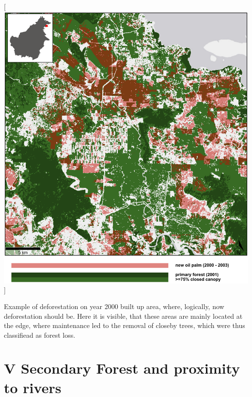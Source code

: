\documentclass[
  letterpaper,
  DIV=11,
  numbers=noendperiod]{scrreprt}
\begin{document}
{[}\includegraphics[width=1\textwidth,height=\textheight]{text/../code/results/maps/validation_built_up_deforestation.png}{]}
\normalcolor

Example of deforestation on year 2000 built up area, where, logically,
now deforestation should be. Here it is visible, that these areas are
mainly located at the edge, where maintenance led to the removal of
closeby trees, which were thus classifiead as forest loss. \newpage

\hypertarget{secondary-forest-and-proximity-to-rivers}{%
\section*{\texorpdfstring{\textsc{V} Secondary Forest and proximity to
rivers}{ Secondary Forest and proximity to rivers}}\label{secondary-forest-and-proximity-to-rivers}}


\color{white}
\end{document}
